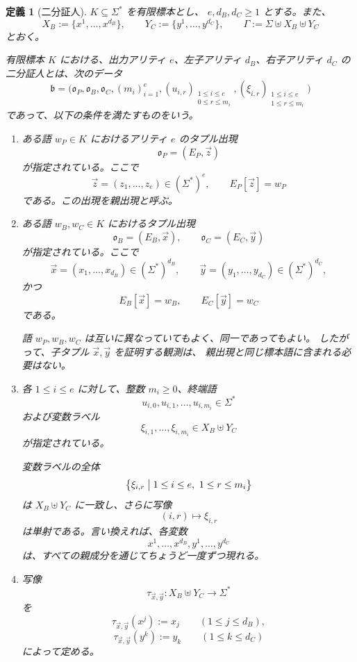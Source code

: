 \documentclass[11pt,a4paper]{ltjsarticle}
\newtheorem{definition}[theorem]{定義}
\theoremstyle{remark}
\newcommand{\tuple}[1]{\vec{#1}}
\begin{document}
\begin{definition}[二分証人]
\label{def:binary-witness}
\(K\subseteq\Sigma^*\) を有限標本とし、
\(e,d_B,d_C\ge1\) とする。また、
\[
  X_B:=\{x^1,\ldots,x^{d_B}\},
  \qquad
  Y_C:=\{y^1,\ldots,y^{d_C}\},
  \qquad
  \Gamma:=\Sigma\uplus X_B\uplus Y_C
\]
とおく。

有限標本 \(K\) における、出力アリティ \(e\)、左子アリティ
\(d_B\)、右子アリティ \(d_C\) の\emph{二分証人}とは、次のデータ
\[
  \mathfrak b
  =
  \bigl(
    \mathfrak o_P,
    \mathfrak o_B,
    \mathfrak o_C,
    (m_i)_{i=1}^e,
    (u_{i,r})_{\substack{1\le i\le e\\0\le r\le m_i}},
    (\xi_{i,r})_{\substack{1\le i\le e\\1\le r\le m_i}}
  \bigr)
\]
であって、以下の条件を満たすものをいう。

\begin{enumerate}[label=(\roman*),leftmargin=*]

\item
ある語 \(w_P\in K\) におけるアリティ \(e\) のタプル出現
\[
  \mathfrak o_P=(E_P,\tuple z)
\]
が指定されている。ここで
\[
  \tuple z=(z_1,\ldots,z_e)\in(\Sigma^*)^e,
  \qquad
  E_P[\tuple z]=w_P
\]
である。この出現を\emph{親出現}と呼ぶ。

\item
ある語 \(w_B,w_C\in K\) におけるタプル出現
\[
  \mathfrak o_B=(E_B,\tuple x),
  \qquad
  \mathfrak o_C=(E_C,\tuple y)
\]
が指定されている。ここで
\[
  \tuple x=(x_1,\ldots,x_{d_B})\in(\Sigma^*)^{d_B},
  \qquad
  \tuple y=(y_1,\ldots,y_{d_C})\in(\Sigma^*)^{d_C},
\]
かつ
\[
  E_B[\tuple x]=w_B,
  \qquad
  E_C[\tuple y]=w_C
\]
である。

語 \(w_P,w_B,w_C\) は互いに異なっていてもよく、同一であってもよい。
したがって、子タプル \(\tuple x,\tuple y\) を証明する観測は、
親出現と同じ標本語に含まれる必要はない。

\item
各 \(1\le i\le e\) に対して、整数 \(m_i\ge0\)、終端語
\[
  u_{i,0},u_{i,1},\ldots,u_{i,m_i}\in\Sigma^*
\]
および変数ラベル
\[
  \xi_{i,1},\ldots,\xi_{i,m_i}\in X_B\uplus Y_C
\]
が指定されている。

変数ラベルの全体
\[
  \bigl\{
    \xi_{i,r}
    \bigm|
    1\le i\le e,\ 1\le r\le m_i
  \bigr\}
\]
は \(X_B\uplus Y_C\) に一致し、さらに写像
\[
  (i,r)\longmapsto \xi_{i,r}
\]
は単射である。言い換えれば、各変数
\[
  x^1,\ldots,x^{d_B},
  y^1,\ldots,y^{d_C}
\]
は、すべての親成分を通じてちょうど一度ずつ現れる。

\item
写像
\[
  \tau_{\tuple x,\tuple y}
  \colon X_B\uplus Y_C\to\Sigma^*
\]
を
\[
  \tau_{\tuple x,\tuple y}(x^j):=x_j
  \qquad (1\le j\le d_B),
\]
\[
  \tau_{\tuple x,\tuple y}(y^k):=y_k
  \qquad (1\le k\le d_C)
\]
によって定める。


\end{enumerate}
\end{definition}
\end{document}
